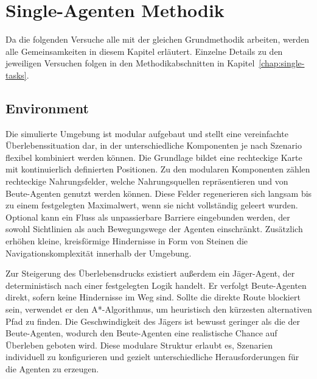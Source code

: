 \chapter{Single-Agenten Methodik}
\label{chap:methodology}
Da die folgenden Versuche alle mit der gleichen Grundmethodik arbeiten, werden alle Gemeinsamkeiten in diesem Kapitel erläutert. Einzelne Details zu den jeweiligen Versuchen folgen in den Methodikabschnitten in Kapitel~\ref{chap:single-tasks}.

\section{Environment}

Die simulierte Umgebung ist modular aufgebaut und stellt eine vereinfachte Überlebenssituation dar, in der unterschiedliche Komponenten je nach Szenario flexibel kombiniert werden können. Die Grundlage bildet eine rechteckige Karte mit kontinuierlich definierten Positionen. Zu den modularen Komponenten zählen rechteckige Nahrungsfelder, welche Nahrungsquellen repräsentieren und von Beute-Agenten genutzt werden können. Diese Felder regenerieren sich langsam bis zu einem festgelegten Maximalwert, wenn sie nicht vollständig geleert wurden. Optional kann ein Fluss als unpassierbare Barriere eingebunden werden, der sowohl Sichtlinien als auch Bewegungswege der Agenten einschränkt. Zusätzlich erhöhen kleine, kreisförmige Hindernisse in Form von Steinen die Navigationskomplexität innerhalb der Umgebung.

Zur Steigerung des Überlebensdrucks existiert außerdem ein Jäger-Agent, der deterministisch nach einer festgelegten Logik handelt. Er verfolgt Beute-Agenten direkt, sofern keine Hindernisse im Weg sind. Sollte die direkte Route blockiert sein, verwendet er den A*-Algorithmus, um heuristisch den kürzesten alternativen Pfad zu finden. Die Geschwindigkeit des Jägers ist bewusst geringer als die der Beute-Agenten, wodurch den Beute-Agenten eine realistische Chance auf Überleben geboten wird. Diese modulare Struktur erlaubt es, Szenarien individuell zu konfigurieren und gezielt unterschiedliche Herausforderungen für die Agenten zu erzeugen.

